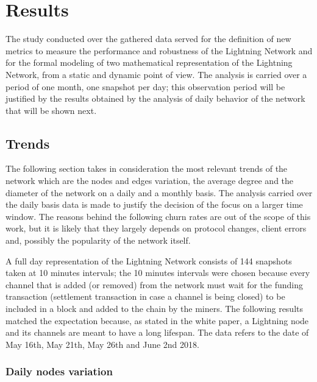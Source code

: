 
	\chapter{Results}
	
	The study conducted over the gathered data served for the definition of new metrics to measure the performance and robustness of the Lightning Network and for the formal modeling of two mathematical representation of the Lightning Network, from a static and dynamic point of view. The analysis is carried over a period of one month, one snapshot per day; this observation period will be justified by the results obtained by the analysis of daily behavior of the network that will be shown next.
	
	\section{Trends}
	
	The following section takes in consideration the most relevant trends of the network which are the nodes and edges variation, the average degree and the diameter of the network on a daily and a monthly basis. The analysis carried over the daily basis data is made to justify the decision of the focus on a larger time window. The reasons behind the following churn rates are out of the scope of this work, but it is likely that they largely depends on protocol changes, client errors and, possibly the popularity of the network itself.
	
	A full day representation of the Lightning Network consists of 144 snapshots taken at 10 minutes intervals; the 10 minutes intervals were chosen because every channel that is added (or removed) from the network must wait for the funding transaction (settlement transaction in case a channel is being closed) to be included in a block and added to the chain by the miners. The following results matched the expectation because, as stated in the white paper, a Lightning node and its channels are meant to have a long lifespan. The data refers to the date of May 16th, May 21th, May 26th and June 2nd 2018.
	
	\subsection{Daily nodes variation}
	
